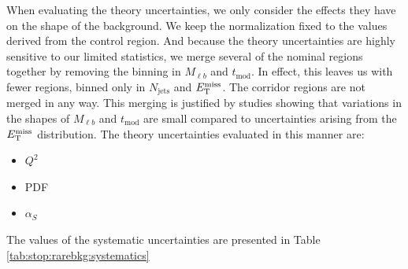 When evaluating the theory uncertainties, we only consider the effects
they have on the shape of the background. We keep the normalization
fixed to the values derived from the control region. And because the
theory uncertainties are highly sensitive to our limited statistics,
we merge several of the nominal regions together by removing the
binning in $M_{\ell b}$ and $t_\text{mod}$. In effect, this leaves us
with fewer regions, binned only in $N_\text{jets}$ and $E_\text{T}^\text{miss}$. The
corridor regions are not merged in any way. This merging is justified
by studies showing that variations in the shapes of $M_{\ell b}$ and
$t_\text{mod}$ are small compared to uncertainties arising from the
$E_\text{T}^\text{miss}$ distribution. The theory uncertainties evaluated in this manner
are:
\begin{itemize}
\item $Q^2$
\item PDF
\item $\alpha_S$
\end{itemize}

The values of the systematic uncertainties are presented in Table
\ref{tab:stop:rarebkg:systematics}


